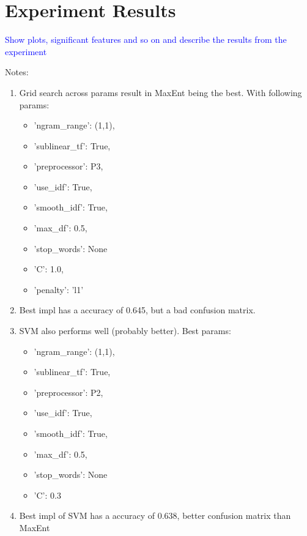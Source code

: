 \section{Experiment Results}
\textcolor{blue}{Show plots, significant features and so on and describe the results from the experiment}

Notes:
\begin{enumerate}
\item Grid search across params result in MaxEnt being the best. With following params:
	\begin{itemize}
		\item 'ngram\_range': (1,1),
		\item  'sublinear\_tf': True,
		\item  'preprocessor': P3,
		\item  'use\_idf': True,
		\item  'smooth\_idf': True,
		\item  'max\_df': 0.5,
		\item  'stop\_words': None
	\end{itemize}
	\begin{itemize}
		\item 'C': 1.0,
		\item 'penalty': 'l1'
	\end{itemize}
	
\item Best impl has a accuracy of 0.645, but a bad confusion matrix.

\item SVM also performs well (probably better). Best params:
	\begin{itemize}
		\item 'ngram\_range': (1,1),
		\item  'sublinear\_tf': True,
		\item  'preprocessor': P2,
		\item  'use\_idf': True,
		\item  'smooth\_idf': True,
		\item  'max\_df': 0.5,
		\item  'stop\_words': None
	\end{itemize}
	\begin{itemize}
		\item 'C': 0.3
	\end{itemize}

\item Best impl of SVM has a accuracy of 0.638, better confusion matrix than MaxEnt


\end{enumerate}

